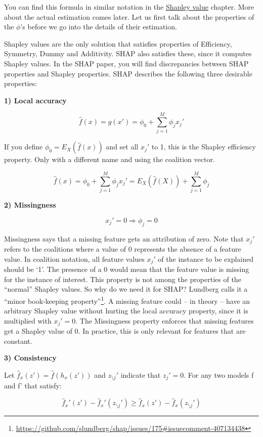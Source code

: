 \documentclass[
  10pt,
]{scrbook}
\renewcommand{\href}[2]{#2\footnote{\url{#1}}}
\begin{document}
You can find this formula in similar notation in the \protect\hyperlink{shapley}{Shapley value} chapter.
More about the actual estimation comes later.
Let us first talk about the properties of the \(\phi\)'s before we go into the details of their estimation.

Shapley values are the only solution that satisfies properties of Efficiency, Symmetry, Dummy and Additivity.
SHAP also satisfies these, since it computes Shapley values.
In the SHAP paper, you will find discrepancies between SHAP properties and Shapley properties.
SHAP describes the following three desirable properties:

\textbf{1) Local accuracy}

\[\hat{f}(x)=g(x')=\phi_0+\sum_{j=1}^M\phi_jx_j'\]

If you define \(\phi_0=E_X(\hat{f}(x))\) and set all \(x_j'\) to 1, this is the Shapley efficiency property.
Only with a different name and using the coalition vector.

\[\hat{f}(x)=\phi_0+\sum_{j=1}^M\phi_jx_j'=E_X(\hat{f}(X))+\sum_{j=1}^M\phi_j\]

\textbf{2) Missingness}

\[x_j'=0\Rightarrow\phi_j=0\]

Missingness says that a missing feature gets an attribution of zero.
Note that \(x_j'\) refers to the coalitions where a value of 0 represents the absence of a feature value.
In coalition notation, all feature values \(x_j'\) of the instance to be explained should be `1'.
The presence of a 0 would mean that the feature value is missing for the instance of interest.
This property is not among the properties of the ``normal'' Shapley values.
So why do we need it for SHAP?
Lundberg calls it a \href{https://github.com/slundberg/shap/issues/175\#issuecomment-407134438}{``minor book-keeping property''}.
A missing feature could -- in theory -- have an arbitrary Shapley value without hurting the local accuracy property, since it is multiplied with \(x_j'=0\).
The Missingness property enforces that missing features get a Shapley value of 0.
In practice, this is only relevant for features that are constant.

\textbf{3) Consistency}

Let \(\hat{f}_x(z')=\hat{f}(h_x(z'))\) and \(z_{\setminus{}j}'\) indicate that \(z_j'=0\).
For any two models f and f' that satisfy:

\[\hat{f}_x'(z')-\hat{f}_x'(z_{\setminus{}j}')\geq{}\hat{f}_x(z')-\hat{f}_x(z_{\setminus{}j}')\]
\end{document}

